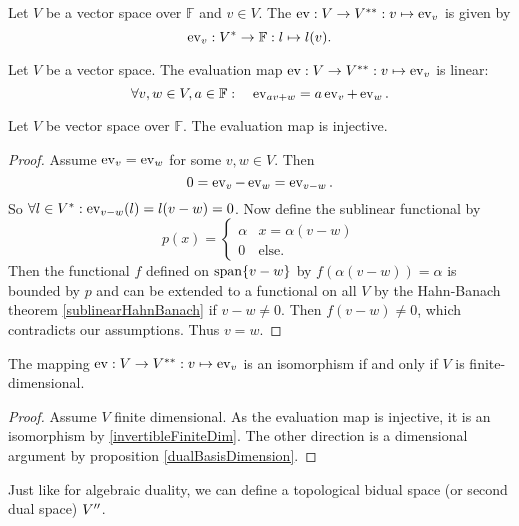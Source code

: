 \begin{definition}
Let $V$ be a vector space over $\mathbb{F}$ and $v\in V$. The  $\operatorname{ev}: V\to {V}^{**}: v\mapsto \operatorname{ev}_v$ is given by
\[ \operatorname{ev}_v: {V}^* \to \mathbb{F}: l\mapsto l(v). \]
\end{definition}

\begin{lemma}
Let $V$ be a vector space. The evaluation map $\operatorname{ev}: V\to {V}^{**}: v\mapsto \operatorname{ev}_v$ is linear:
\[ \forall v,w\in V, a\in\mathbb{F}: \quad \operatorname{ev}_{av + w} = a\operatorname{ev}_v + \operatorname{ev}_w. \]
\end{lemma}
\begin{lemma}
Let $V$ be vector space over $\mathbb{F}$. The evaluation map is injective.
\end{lemma}
\begin{proof}
Assume $\operatorname{ev}_v = \operatorname{ev}_w$ for some $v,w\in V$. Then
\[ 0 = \operatorname{ev}_v - \operatorname{ev}_w  = \operatorname{ev}_{v-w}. \]
So $\forall l\in {V}^*: \operatorname{ev}_{v-w}(l) = l(v-w) = 0$. Now define the sublinear functional by
\[ p(x) = \begin{cases}
\alpha & x = \alpha(v-w) \\
0 & \text{else}.
\end{cases} \]
Then the functional $f$ defined on $\operatorname{span}\{v-w\}$ by $f(\alpha(v-w)) = \alpha$ is bounded by $p$ and can be extended to a functional on all $V$ by the Hahn-Banach theorem \ref{sublinearHahnBanach} if $v-w\neq 0$. Then $f(v-w) \neq 0$, which contradicts our assumptions. Thus $v=w$.
\end{proof}

\begin{proposition}
The mapping $\operatorname{ev}: V\to {V}^{**}: v\mapsto \operatorname{ev}_v$ is an isomorphism \textup{if and only if} $V$ is finite-dimensional.
\end{proposition}
\begin{proof}
Assume $V$ finite dimensional. As the evaluation map is injective, it is an isomorphism by \ref{invertibleFiniteDim}.
The other direction is a dimensional argument by proposition \ref{dualBasisDimension}.
\end{proof}


Just like for algebraic duality, we can define a topological bidual space (or second dual space) ${V}^{\prime\prime}$.

